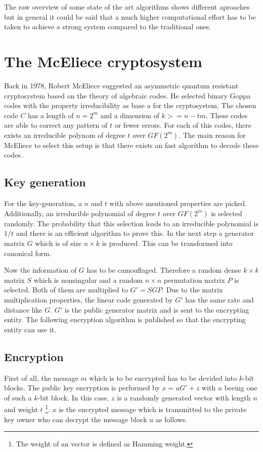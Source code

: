 The raw overview of some state of the art algorithms shows different aproaches but in general it could be said that a much higher computational effort has to be taken to achieve a strong system compared to the traditional ones. 

\section{The McEliece cryptosystem}
\label{mceliece}
Back in 1978, Robert McEliece suggested an asymmetric quantum resistant cryptosystem based on the theory of algebraic codes. He selected binary Goppa codes with the property irreducibility as base a for the cryptosystem\cite{mceliece1978public}. The chosen code $C$ has a length of $n = 2^m$ and a dimension of $k >= n - tm$. These codes are able to correct any pattern of $t$ or fewer errors. 
For each of this codes, there exists an irreducible polynom of degree $t$ over $GF(2^m)$. 
The main reason for McEliece to select this setup is that there exists an fast algorithm to decode these codes\cite{mceliece2002theory}.

\subsection*{Key generation}
For the key-generation, a $n$ and $t$ with above mentioned properties are picked. Additionally, an irreducible polynomial of degree $t$ over $GF(2^m)$  is selected randomly. The probability that this selection leads to an irreducible polynomial is $1/t$ and there is an efficient algorithm to prove this\cite{berlekamp1968algebraic}.
In the next step a generator matrix $G$ which is of size $n \times k$ is produced. This can be transformed into canonical form. 

Now the information of $G$ has to be camouflaged. Therefore a random dense $k \times k$ matrix $S$ which is nonsingular and a random $n \times n$ permutation matrix $P$ is selected. Both of them are multiplied to $G' = SGP$. Due to the matrix multiplication properties, the linear code generated by $G'$ has the same rate and distance like $G$. $G'$ is the public generator matrix and is sent to the encrypting entity. 
\newline
\newline
The following encryption algorithm is published so that the encrypting entity can use it. 

\subsection*{Encryption}
First of all, the message $m$ which is to be encrypted has to be devided into $k$-bit blocks. The public key encryption is performed by $x = uG' + z$ with $u$ beeing one of such a $k$-bit block. In this case, $z$ is a randomly generated vector with length $n$ and weight $t$ \footnote{The weight of an vector is defined as Hamming weight.}.
\newline
\newline
$x$ is the encrypted message which is transmitted to the private key owner who can decrypt the message block $u$ as follows. 


